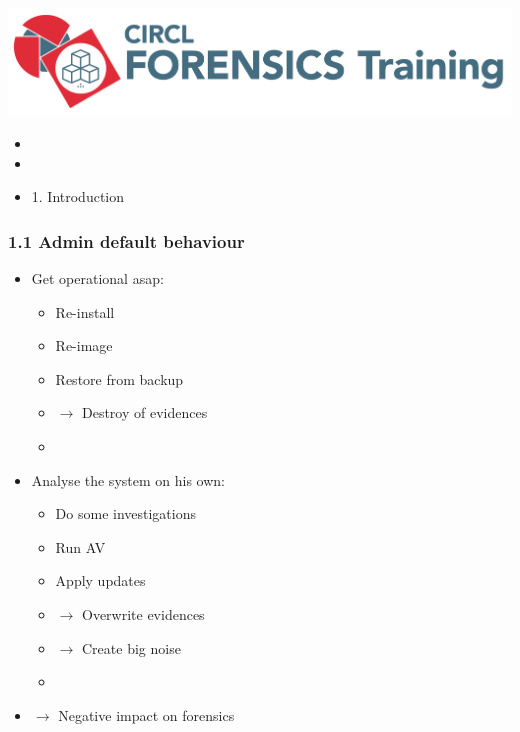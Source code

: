 

\begin{frame}
    \includegraphics[scale=0.3]{images/logo-circl-Forensics.png}
    \begin{itemize}
        \item[]
        \item[]
        \item[] 1. Introduction
    \end{itemize}
\end{frame}


\begin{frame}
  \frametitle{1.1 Admin default behaviour}
  \begin{itemize}
    \item Get operational asap:
    \begin{itemize}
      \item Re-install
      \item Re-image
      \item Restore from backup
      \item[] $\to$ Destroy of evidences
      \item[]
    \end{itemize}
    \item Analyse the system on his own:
    \begin{itemize}
      \item Do some investigations
      \item Run AV
      \item Apply updates
      \item[] $\to$ Overwrite evidences
      \item[] $\to$ Create big noise
      \item[]
    \end{itemize}
    \item[] $\to$ Negative impact on forensics
  \end{itemize}
\end{frame}


